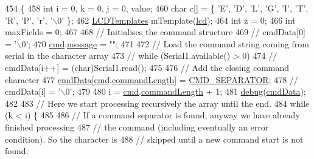 \begin{DoxyCode}
454               \{
458   \textcolor{keywordtype}{int} i = 0, k = 0, j = 0, value;
460   \textcolor{keywordtype}{char} c[] = \{ \textcolor{charliteral}{'E'}, \textcolor{charliteral}{'D'}, \textcolor{charliteral}{'L'}, \textcolor{charliteral}{'G'}, \textcolor{charliteral}{'I'}, \textcolor{charliteral}{'T'}, \textcolor{charliteral}{'R'}, \textcolor{charliteral}{'P'}, \textcolor{charliteral}{'r'}, \textcolor{charliteral}{'\(\backslash\)0'} \};
462   \hyperlink{class_l_c_d_templates}{LCDTemplates} mTemplate(\hyperlink{_meditech___chip_kit_control_panel_8pde_ae0b100905fb0ed88dddaafda0aa05379}{lcd});
464   \textcolor{keywordtype}{int} z = 0;
466   \textcolor{keywordtype}{int} maxFields = 0;
467   
468   \textcolor{comment}{// Initialises the command structure}
469 \textcolor{comment}{//  cmdData[0] = '\(\backslash\)0';}
470   \hyperlink{_meditech___chip_kit_control_panel_8pde_a9ec7ba7a86dba057afdae246ca1ac40e}{cmd}.\hyperlink{structparse_command_a5d2f84606922f34ad6a8ca5f7d8a59b5}{message} = \textcolor{stringliteral}{""};
471 
472   \textcolor{comment}{// Load the command string coming from serial in the character array}
473 \textcolor{comment}{//  while (Serial1.available() > 0)}
474 \textcolor{comment}{//      cmdData[i++] = (char)Serial1.read();}
475   
476   \textcolor{comment}{// Add the closing command character}
477   \hyperlink{_meditech___chip_kit_control_panel_8pde_afd31a444e0380e6be247c64cdb1510a9}{cmdData}[\hyperlink{_meditech___chip_kit_control_panel_8pde_a9ec7ba7a86dba057afdae246ca1ac40e}{cmd}.\hyperlink{structparse_command_a8359e121af4d2f16e054ead0b7844a30}{commandLength}] = \hyperlink{_command_processor_8h_aa3115116a4036d93c8c91cf7e0f13c70}{CMD\_SEPARATOR};
478 \textcolor{comment}{//  cmdData[i] = '\(\backslash\)0';}
479   
480   i = \hyperlink{_meditech___chip_kit_control_panel_8pde_a9ec7ba7a86dba057afdae246ca1ac40e}{cmd}.\hyperlink{structparse_command_a8359e121af4d2f16e054ead0b7844a30}{commandLength} + 1;
481   \hyperlink{_meditech___chip_kit_control_panel_8pde_ad5b3677e61ca769d9d9e5cf9cfa1b33c}{debug}(\hyperlink{_meditech___chip_kit_control_panel_8pde_afd31a444e0380e6be247c64cdb1510a9}{cmdData});
482   
483   \textcolor{comment}{// Here we start processing recursively the array until the end.}
484   \textcolor{keywordflow}{while} (k < i) \{
485     
486     \textcolor{comment}{// If a command separator is found, anyway we have already finished processing}
487     \textcolor{comment}{// the command (including eventually an error condition). So the character is}
488     \textcolor{comment}{// skipped until a new command start is not found.}

\end{DoxyCode}
